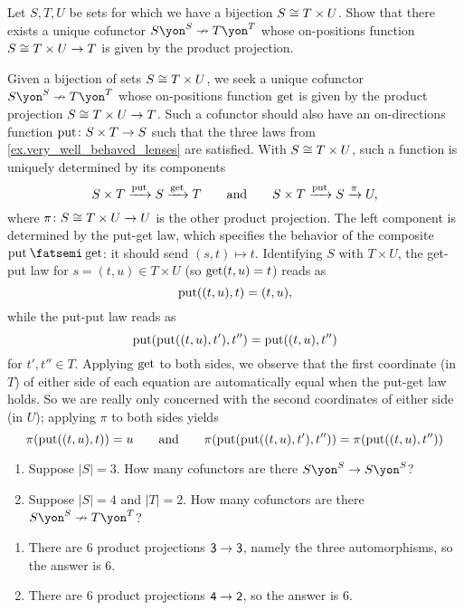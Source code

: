 \documentclass[Book-Poly]{subfiles}
\begin{document}
\begin{exercise}\label{exc.well_behaved_boring}
Let $S,T,U$ be sets for which we have a bijection $S\cong T\times U$.
Show that there exists a unique cofunctor $S\yon^S\cof T\yon^T$ whose on-positions function $S\cong T\times U\to T$ is given by the product projection.
\begin{solution}
Given a bijection of sets $S\cong T\times U$, we seek a unique cofunctor $S\yon^S\cof T\yon^T$ whose on-positions function $\mathrm{get}$ is given by the product projection $S\cong T\times U\to T$.
Such a cofunctor should also have an on-directions function $\mathrm{put}\colon S\times T\to S$ such that the three laws from \cref{ex.very_well_behaved_lenses} are satisfied.
With $S\cong T\times U$, such a function is uniquely determined by its components
\[
    S\times T\xrightarrow{\mathrm{put}} S\xrightarrow{\mathrm{get}} T \qquad\text{and}\qquad S\times T\xrightarrow{\mathrm{put}} S\xrightarrow{\pi} U,
\]
where $\pi\colon S\cong T\times U\to U$ is the other product projection.
The left component is determined by the put-get law, which specifies the behavior of the composite $\lensput\then\lensget$: it should send $(s,t)\mapsto t$.
Identifying $S$ with $T\times U$, the get-put law for $s=(t,u)\in T\times U$ (so $\mathrm{get}(t,u)=t$) reads as
\[
    \mathrm{put}((t,u),t)=(t,u),
\]
while the put-put law reads as
\[
    \mathrm{put}(\mathrm{put}((t,u),t'),t'')=\mathrm{put}((t,u),t'')
\]
for $t',t''\in T$.
Applying $\mathrm{get}$ to both sides, we observe that the first coordinate (in $T$) of either side of each equation are automatically equal when the put-get law holds.
So we are really only concerned with the second coordinates of either side (in $U$); applying $\pi$ to both sides yields
\[
    \pi(\mathrm{put}((t,u),t))=u \qquad\text{and}\qquad \pi(\mathrm{put}(\mathrm{put}((t,u),t'),t''))=\pi(\mathrm{put}((t,u),t''))
\]
\end{solution}
\end{exercise}

\begin{exercise}\label{exc.how_many_vwbls}
\begin{enumerate}
	\item Suppose $|S|=3$. How many cofunctors are there $S\yon^S\to S\yon^S$?
	\item Suppose $|S|=4$ and $|T|=2$. How many cofunctors are there $S\yon^S\cof T\yon^T$?
\qedhere
\end{enumerate}
\begin{solution}
\begin{enumerate}
    \item There are 6 product projections $\textsf{3}\to \textsf{3}$, namely the three automorphisms, so the answer is 6.
    \item There are 6 product projections $\textsf{4}\to\textsf{2}$, so the answer is 6.
\end{enumerate}
\end{solution}
\end{exercise}
\end{document}
